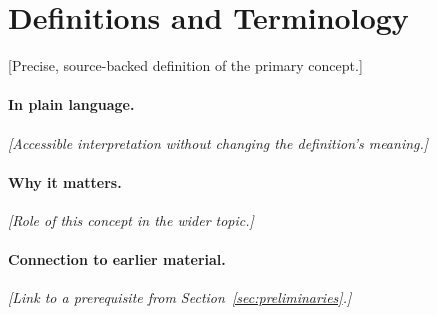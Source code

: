 \section{Definitions and Terminology}
\label{sec:definitions}

\begin{definition}
\label{def:primary-concept}
[Precise, source-backed definition of the primary concept.]
\end{definition}

\paragraph{In plain language.}
\emph{[Accessible interpretation without changing the definition's meaning.]}

\paragraph{Why it matters.}
\emph{[Role of this concept in the wider topic.]}

\paragraph{Connection to earlier material.}
\emph{[Link to a prerequisite from Section~\ref{sec:preliminaries}.]}

